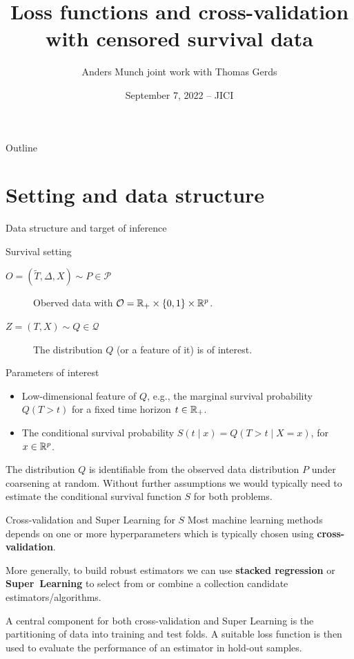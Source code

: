 \documentclass[smaller]{beamer}\usepackage{listings}
\institute{PhD Student, Section of Biostatistics \\ University of Copenhagen}
\author{Anders Munch \newline \small joint work with Thomas Gerds}
\date{September 7, 2022 -- JICI}
\title{Loss functions and cross-validation with censored survival data}
\begin{document}
\maketitle
\begin{frame}{Outline}
\tableofcontents
\end{frame}

\section{Setting and data structure}
\label{sec:orgf36dbc7}
\begin{frame}[label={sec:org53f9762}]{Data structure and target of inference}
\small
\begin{block}{Survival setting}
\begin{description}
\item[{\(O = (\tilde T, \Delta, X) \sim P \in \mathcal{P}\)}] Oberved data with \(\mathcal{O} = \mathbb{R}_+
  \times \{0,1\} \times \mathbb{R}^p\).
\item[{\(Z = (T, X) \sim Q \in \mathcal{Q}\)}] The distribution \(Q\) (or a feature of it) is of interest.
\end{description}
\end{block}

\begin{block}{Parameters of interest}
\begin{itemize}
\item Low-dimensional feature of \(Q\), e.g., the marginal survival probability \(Q(T > t)\) for a fixed
time horizon \(t \in \mathbb{R}_+\).
\item The conditional survival probability \(S(t \mid x) = Q(T > t \mid X=x)\), for \(x \in \mathbb{R}^p\).
\end{itemize}

\hfill

The distribution \(Q\) is identifiable from the observed data distribution \(P\) under coarsening at
random. Without further assumptions we would typically need to estimate the conditional survival
function \(S\) for both problems.
\end{block}
\end{frame}

\begin{frame}[label={sec:org6f6fdbf}]{Cross-validation and Super Learning for \(S\)}
Most machine learning methods depends on one or more hyperparameters which is typically chosen using
\textbf{cross-validation}.

\vfill

More generally, to build robust estimators we can use \textbf{stacked regression} or
\textbf{Super~Learning} \citep{breiman1996stacked,van2007super} to select from or combine a
collection candidate estimators/algorithms.

\vfill

A central component for both cross-validation and Super Learning is the partitioning of data into
training and test folds. A suitable loss function is then used to evaluate the performance of an
estimator in hold-out samples.
\end{frame}
\end{document}

